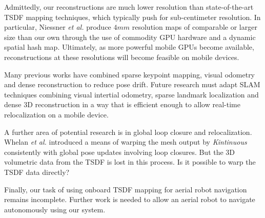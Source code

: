 \documentclass[conference]{IEEEtran}
\newcommand{\etal}{\textit{et al.}\xspace}
\newcommand{\Tango}{\textit{Tango}\xspace}
\newcommand{\TSDF}{TSDF\xspace}
\newif\iffinalcopy
\begin{document}
Admittedly, our reconstructions are much lower resolution than state-of-the-art
\TSDF mapping techniques, which typically push for sub-centimeter resolution. In
particular, Niessner \etal \cite{NiessnerHashing} produce $4mm$ resolution maps
of comparable or larger size than our own through the use of commodity GPU
hardware and a dynamic spatial hash map. Ultimately, as more powerful mobile
GPUs become available, reconstructions at these resolutions will become
feasible on mobile devices. 

Many previous works \cite{StuecklerSparseDense, niessner2014combining} have
combined sparse keypoint mapping, visual odometry and dense reconstruction to
reduce pose drift. Future research must adapt SLAM techniques combining visual
intertial odometry, sparse landmark localization and dense 3D reconstruction in
a way that is efficient enough to allow real-time relocalization on a mobile device.

A further area of potential research is in global loop closure and
relocalization. Whelan \etal\cite{WhelanLoopClose} introduced a means of warping
the mesh output by \textit{Kintinuous} consistently with global pose updates
 involving loop closures. But the 3D volumetric data from the \TSDF is lost in
 this process. Is it possible to warp the \TSDF data directly?

Finally, our task of using onboard \TSDF mapping for aerial robot navigation
remains incomplete. Further work is needed to allow an aerial robot to navigate
autonomously using our system.


\iffinalcopy
	\section*{Acknowledgements}
	This work was done as part of Google's Advanced Technologies and Projects
	division (ATAP) for \Tango. Thanks to Johnny Lee, Joel Hesch, Esha
	Nerurkar, and Simon Lynen and other ATAP members for their close collaboration
	and support on this project. Thanks to Ryan Hickman for collecting outdoor data.
\fi



 
\end{document}
